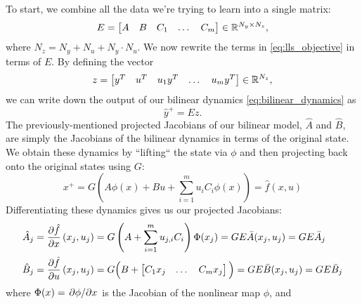 \documentclass{article}
\begin{document}
To start, we combine all the data we're trying to learn into a single matrix:
\begin{equation}
  E = \begin{bmatrix} A & B & C_1 & \dots & C_m \end{bmatrix} \in \mathbb{R}^{N_y \times N_z},
\end{equation}
where $N_z = N_y + N_u + N_y \cdot N_u$.  We now rewrite the terms in
\eqref{eq:lls_objective} in terms of $E$. By defining the vector 
\begin{equation}
  z = \begin{bmatrix} y^T & u^T & u_1 y^T & \dots & u_m y^T \end{bmatrix} \in \mathbb{R}^{N_z},
\end{equation}
we can write down 
the output of our bilinear dynamics \eqref{eq:bilinear_dynamics} as 
\begin{equation} \label{eq:bilinear_dynamics_z}
  \hat{y}^+ = E z.
\end{equation}
The previously-mentioned projected Jacobians of our bilinear model, $\hat{A}$ and
$\hat{B}$, are simply the Jacobians of the bilinear dynamics in terms of the original
state. We obtain these dynamics by ``lifting`` the state via $\phi$ and then projecting
back onto the original states using $G$:
\begin{equation} \label{eq:projected_dynamics}
  x^+ = G \left( A \phi(x) + B u + \sum_{i=1}^m u_i C_i \phi(x) \right)  = \hat{f}(x,u) 
\end{equation}
Differentiating these dynamics gives us our projected Jacobians:
\begin{subequations} \label{eq:projected_jacobians}
  \begin{align}
    \hat{A}_j &= \pdv{\hat{f}}{x}\left(x_j,u_j\right) 
    = G \left(A + \sum_{i=1}^m u_{j,i} C_i \right) \Phi(x_j)
    = G E \bar{A}(x_j,u_j) = G E \bar{A}_j \\
    \hat{B}_j &= \pdv{\hat{f}}{u}\left(x_j,u_j\right) 
    = G \Big(B + \begin{bmatrix} C_1 x_j & \dots & C_m x_j \end{bmatrix} \Big)
    = G E \bar{B}(x_j,u_j) = G E \bar{B}_j
  \end{align}
\end{subequations}
where $\Phi(x) = \pdv*{\phi}{x}$ is the Jacobian of the nonlinear map $\phi$, and
\end{document}
